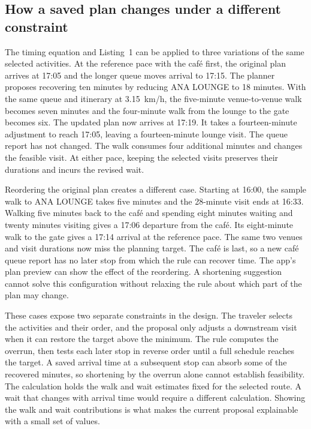\documentclass[sigconf,nonacm,balance=false]{acmart}
\begin{document}
\subsection{How a saved plan changes under a different constraint}
The timing equation and Listing~1 can be applied to three variations of the same selected activities. At the reference pace with the caf\'e first, the original plan arrives at 17:05 and the longer queue moves arrival to 17:15. The planner proposes recovering ten minutes by reducing ANA LOUNGE to 18 minutes. With the same queue and itinerary at 3.15~km/h, the five-minute venue-to-venue walk becomes seven minutes and the four-minute walk from the lounge to the gate becomes six. The updated plan now arrives at 17:19. It takes a fourteen-minute adjustment to reach 17:05, leaving a fourteen-minute lounge visit. The queue report has not changed. The walk consumes four additional minutes and changes the feasible visit. At either pace, keeping the selected visits preserves their durations and incurs the revised wait.

Reordering the original plan creates a different case. Starting at 16:00, the sample walk to ANA LOUNGE takes five minutes and the 28-minute visit ends at 16:33. Walking five minutes back to the caf\'e and spending eight minutes waiting and twenty minutes visiting gives a 17:06 departure from the caf\'e. Its eight-minute walk to the gate gives a 17:14 arrival at the reference pace. The same two venues and visit durations now miss the planning target. The caf\'e is last, so a new caf\'e queue report has no later stop from which the rule can recover time. The app's plan preview can show the effect of the reordering. A shortening suggestion cannot solve this configuration without relaxing the rule about which part of the plan may change.

These cases expose two separate constraints in the design. The traveler selects the activities and their order, and the proposal only adjusts a downstream visit when it can restore the target above the minimum. The rule computes the overrun, then tests each later stop in reverse order until a full schedule reaches the target. A saved arrival time at a subsequent stop can absorb some of the recovered minutes, so shortening by the overrun alone cannot establish feasibility. The calculation holds the walk and wait estimates fixed for the selected route. A wait that changes with arrival time would require a different calculation. Showing the walk and wait contributions is what makes the current proposal explainable with a small set of values.
\end{document}
